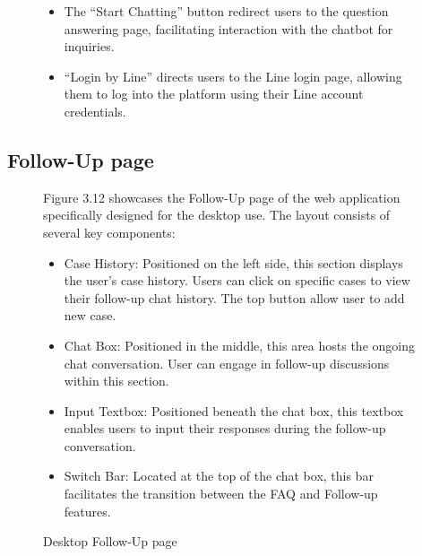 \documentclass[12pt,oneside,openright,a4paper]{cpe-english-project}
\begin{document}
\begin{figure}[!h]
\begin{flushleft}
        \begin{itemize}
          \item The “Start Chatting” button redirect users to the question answering page, facilitating interaction with the chatbot for inquiries.
          \item “Login by Line” directs users to the Line login page, allowing them to log into the platform using their Line account credentials.
        \end{itemize}
      \end{flushleft}
    \end{figure}
    \newpage

    \subsection{Follow-Up page}
      \begin{figure}[!h]
        \centering
        \caption{Desktop Follow-Up page}\label{fig:Desk_Follow}
        \begin{flushleft}
          \qquad Figure 3.12 showcases the Follow-Up page of the web application specifically designed for the desktop use. The layout consists of several key components: \par
          \begin{itemize}
            \item Case History: Positioned on the left side, this section displays the user’s case history. Users can click on specific cases to view their follow-up chat history. The top button allow user to add new case.
            \item Chat Box: Positioned in the middle, this area hosts the ongoing chat conversation. User can engage in follow-up discussions within this section. 
            \item Input Textbox: Positioned beneath the chat box, this textbox enables users to input their responses during the follow-up conversation. 
            \item Switch Bar: Located at the top of the chat box, this bar facilitates the transition between the FAQ and Follow-up features.
          \end{itemize}
        \end{flushleft}
      \end{figure}
\end{document}
